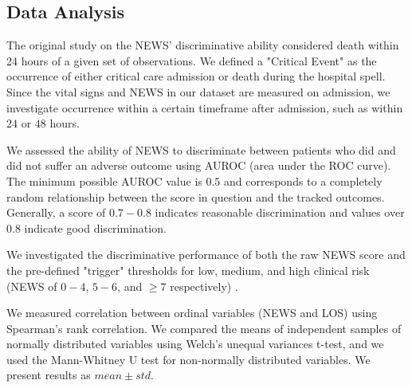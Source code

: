 \documentclass[10pt,journal, compsoc]{IEEEtran}
\begin{document}
\subsection{Data Analysis}
The original study on the NEWS' discriminative ability considered death within 24 hours of a given set of observations. We defined a "Critical Event" as the occurrence of either critical care admission or death during the hospital spell. Since the vital signs and NEWS in our dataset are measured on admission, we investigate occurrence within a certain timeframe after admission, such as within $24$ or $48$ hours.

We assessed the ability of NEWS to discriminate between patients who did and did not suffer an adverse outcome using AUROC (area under the ROC curve). The minimum possible AUROC value is $0.5$ and corresponds to a completely random relationship between the score in question and the tracked outcomes. Generally, a score of $0.7-0.8$ indicates reasonable discrimination and values over $0.8$ indicate good discrimination.

We investigated the discriminative performance of both the raw NEWS score and the pre-defined "trigger" thresholds for low, medium, and high clinical risk (NEWS of $0-4$, $5-6$, and $\geq 7$ respectively) \cite[pp.~30]{RCP17}.

We measured correlation between ordinal variables (NEWS and LOS) using Spearman's rank correlation. We compared the means of independent samples of normally distributed variables using Welch's unequal variances t-test, and we used the Mann-Whitney U test for non-normally distributed variables. We present results as $mean \pm std$.
\end{document}
